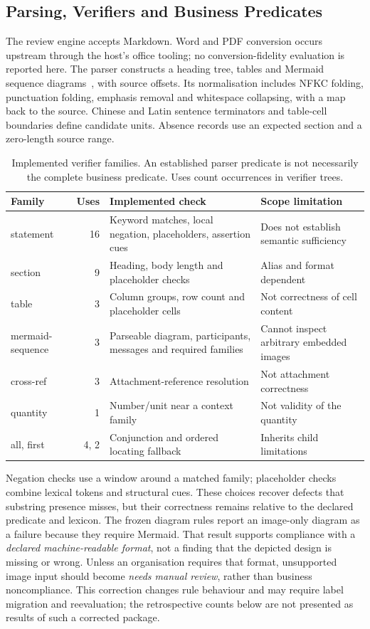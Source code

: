 \documentclass[computers,article,submit,moreauthors]{Definitions/mdpi}
\begin{document}
\subsection{Parsing, Verifiers and Business Predicates}\label{sec:verifiers}

The review engine accepts Markdown. Word and PDF conversion occurs upstream through the host's office tooling; no conversion-fidelity evaluation is reported here. The parser constructs a heading tree, tables and Mermaid sequence diagrams~\cite{mermaid}, with source offsets. Its normalisation includes NFKC folding, punctuation folding, emphasis removal and whitespace collapsing, with a map back to the source. Chinese and Latin sentence terminators and table-cell boundaries define candidate units. Absence records use an expected section and a zero-length source range.

\begin{table}[!ht]
\caption{Implemented verifier families. An established parser predicate is not necessarily the complete business predicate. Uses count occurrences in verifier trees.}
\label{tab:verifiers}
\centering\footnotesize
\begin{tabularx}{\textwidth}{@{}p{2.4cm}rXX@{}}
\toprule
Family & Uses & Implemented check & Scope limitation \\
\midrule
statement & 16 & Keyword matches, local negation, placeholders, assertion cues & Does not establish semantic sufficiency \\
section & 9 & Heading, body length and placeholder checks & Alias and format dependent \\
table & 3 & Column groups, row count and placeholder cells & Not correctness of cell content \\
mermaid-sequence & 3 & Parseable diagram, participants, messages and required families & Cannot inspect arbitrary embedded images \\
cross-ref & 3 & Attachment-reference resolution & Not attachment correctness \\
quantity & 1 & Number/unit near a context family & Not validity of the quantity \\
all, first & 4, 2 & Conjunction and ordered locating fallback & Inherits child limitations \\
\bottomrule
\end{tabularx}
\end{table}

Negation checks use a window around a matched family; placeholder checks combine lexical tokens and structural cues. These choices recover defects that substring presence misses, but their correctness remains relative to the declared predicate and lexicon. The frozen diagram rules report an image-only diagram as a failure because they require Mermaid. That result supports compliance with a \emph{declared machine-readable format}, not a finding that the depicted design is missing or wrong. Unless an organisation requires that format, unsupported image input should become \emph{needs manual review}, rather than business noncompliance. This correction changes rule behaviour and may require label migration and reevaluation; the retrospective counts below are not presented as results of such a corrected package.
\end{document}
